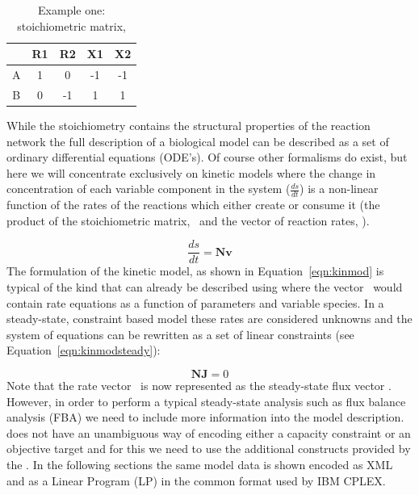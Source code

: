 \begin{table}[h]
  \centering
    \begin{tabular}{c|cccc}
          & R1 & R2 & X1 & X2 \\ \hline
        A & 1 &  0 & -1 & -1 \\
        B & 0 & -1 &  1 &  1 \\
    \end{tabular}
  \caption{Example one: stoichiometric matrix, \Nmat}
  \label{tble:ex1nmat}
\end{table}
%
While the stoichiometry contains the structural properties of the 
reaction network the full description of a biological model can be 
described as a set of ordinary differential equations (ODE's). Of course 
other formalisms do exist, but here we will concentrate exclusively on 
kinetic models where the change in concentration of each variable 
component in the system ($\frac{ds}{dt}$) is a non-linear function of 
the rates of the reactions which either create or consume it (the 
product of the stoichiometric matrix, \Nmat\ and the vector of reaction 
rates, \vvec). 


%
\begin{equation}\label{eqn:kinmod}
  \frac{ds}{dt} = \textbf{Nv}
\end{equation}
%
The formulation of the kinetic model, as shown in 
Equation~\ref{eqn:kinmod} is typical of the kind that can already be 
described using \sbmlthreecore where the vector \vvec\ would contain 
rate equations as a function of parameters and variable species. In a 
steady-state, constraint based model these rates are considered unknowns 
and the system of equations can be rewritten as a set of linear 
constraints (see Equation~\ref{eqn:kinmodsteady}): 


%
\begin{equation}\label{eqn:kinmodsteady}
  \textbf{NJ} = 0
\end{equation}
%
Note that the rate vector \vvec\ is now represented as the steady-state 
flux vector \Jvec. However, in order to perform a typical steady-state 
analysis such as flux balance analysis (FBA) we need to include more 
information into the model description. \sbmlthreecore does not have an 
unambiguous way of encoding either a capacity constraint or an objective 
target and for this we need to use the additional constructs provided by 
the \FBCPackage. In the following sections the same model data is shown 
encoded as XML and as a Linear Program (LP) in the common format used by 
IBM \textsf{CPLEX}. 


